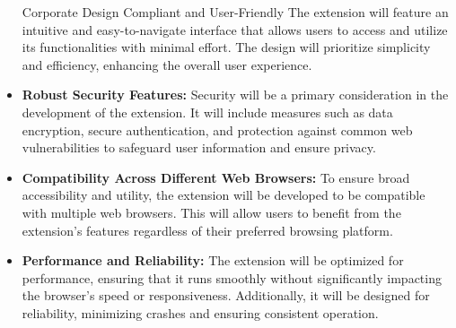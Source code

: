\begin{itemize}
    \item[Corporate Design Compliant and User-Friendly]
    The extension will feature an intuitive and easy-to-navigate interface that allows users to access and utilize its functionalities with minimal effort. The design will prioritize simplicity and efficiency, enhancing the overall user experience.

    \item \textbf{Robust Security Features:}
    Security will be a primary consideration in the development of the extension. It will include measures such as data encryption, secure authentication, and protection against common web vulnerabilities to safeguard user information and ensure privacy.

    \item \textbf{Compatibility Across Different Web Browsers:}
    To ensure broad accessibility and utility, the extension will be developed to be compatible with multiple web browsers. This will allow users to benefit from the extension's features regardless of their preferred browsing platform.

    \item \textbf{Performance and Reliability:}
    The extension will be optimized for performance, ensuring that it runs smoothly without significantly impacting the browser’s speed or responsiveness. Additionally, it will be designed for reliability, minimizing crashes and ensuring consistent operation.
\end{itemize}
